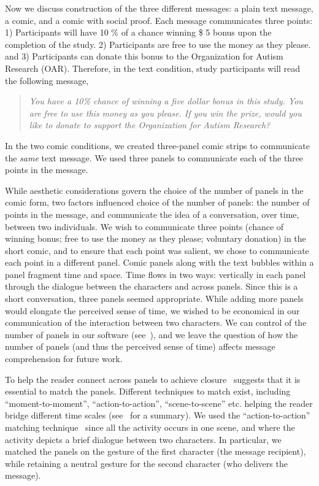 Now we discuss construction of the three different messages: a plain text message, a comic, and a comic with social proof. Each message communicates three points: 1) Participants will have 10 \% of a chance winning \$ 5 bonus upon the completion of the study. 2) Participants are free to use the money as they please. and 3) Participants can donate this bonus to the Organization for Autism Research (OAR). Therefore, in the text condition, study participants will read the following message,
\begin{quote}
  \textit{You have a 10\% chance of winning a five dollar bonus in this study. You are free to use this money as you please. If you win the prize, would you like to donate to support the Organization for Autism Research?}
\end{quote}

In the two comic conditions, we created three-panel comic strips to communicate the \textit{same} text message. We used three panels to communicate each of the three points in the message. 

While aesthetic considerations govern the choice of the number of panels in the comic form, two factors influenced choice of the number of panels: the number of points in the message, and communicate the idea of a conversation, over time, between two individuals. We wish to communicate three points (chance of winning bonus; free to use the money as they please; voluntary donation) in the short comic, and to ensure that each point was salient, we chose to communicate each point in a different panel. Comic panels along with the text bubbles within a panel fragment time and space. Time flows in two ways: vertically in each panel through the dialogue between the characters and across panels. Since this is a short conversation, three panels seemed appropriate. While adding more panels would elongate the perceived sense of time, we wished to be economical in our communication of the interaction between two characters. We can control of the number of panels in our software (see~), and we leave the question of how the number of panels (and thus the perceived sense of time) affects message comprehension for future work.

To help the reader connect across panels to achieve closure~\textcite[][Chapter 3]{scott1993understanding} suggests that it is essential to match the panels. Different techniques to match exist, including ``moment-to-moment'', ``action-to-action'', ``scene-to-scene'' etc. helping the reader bridge different time scales (see~\parencite[][p. 71]{scott1993understanding} for a summary). We used the ``action-to-action'' matching technique~\cite{scott1993understanding} since all the activity occurs in one scene, and where the activity depicts a brief dialogue between two characters. In particular, we matched the panels on the gesture of the first character (the message recipient), while retaining a neutral gesture for the second character (who delivers the message). 



